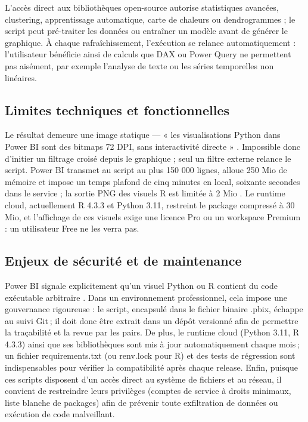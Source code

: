 L’accès direct aux bibliothèques open-source autorise statistiques avancées, clustering, apprentissage automatique, carte de chaleurs ou dendrogrammes ; le script peut pré-traiter les données ou entraîner un modèle avant de générer le graphique.  
À chaque rafraîchissement, l’exécution se relance automatiquement : l’utilisateur bénéficie ainsi de calculs que DAX ou Power Query ne permettent pas aisément, par exemple l’analyse de texte ou les séries temporelles non linéaires.

\subsection{Limites techniques et fonctionnelles}

Le résultat demeure une image statique — « les visualisations Python dans Power BI sont des bitmaps 72 DPI, sans interactivité directe » \parencite{MicrosoftPythonRVisualsDocs2024}.  
Impossible donc d’initier un filtrage croisé depuis le graphique ; seul un filtre externe relance le script.  
Power BI transmet au script au plus 150 000 lignes, alloue 250 Mio de mémoire et impose un temps plafond de cinq minutes en local, soixante secondes dans le service ; la sortie PNG des visuels R est limitée à 2 Mio \parencite{MicrosoftRPackagesService2025}.  
Le runtime cloud, actuellement R 4.3.3 et Python 3.11, restreint le package compressé à 30 Mio, et l’affichage de ces visuels exige une licence Pro ou un workspace Premium : un utilisateur Free ne les verra pas.

\subsection{Enjeux de sécurité et de maintenance}

Power BI signale explicitement qu’un visuel Python ou R contient du code exécutable arbitraire \parencite{MicrosoftPythonRVisualsDocs2024}.  
Dans un environnement professionnel, cela impose une gouvernance rigoureuse : le script, encapsulé dans le fichier binaire .pbix, échappe au suivi Git ; il doit donc être extrait dans un dépôt versionné afin de permettre la traçabilité et la revue par les pairs. De plus, le runtime cloud (Python 3.11, R 4.3.3) ainsi que ses bibliothèques sont mis à jour automatiquement chaque mois ; un fichier requirements.txt (ou renv.lock pour R) et des tests de régression sont indispensables pour vérifier la compatibilité après chaque release. Enfin, puisque ces scripts disposent d’un accès direct au système de fichiers et au réseau, il convient de restreindre leurs privilèges (comptes de service à droits minimaux, liste blanche de packages) afin de prévenir toute exfiltration de données ou exécution de code malveillant.

